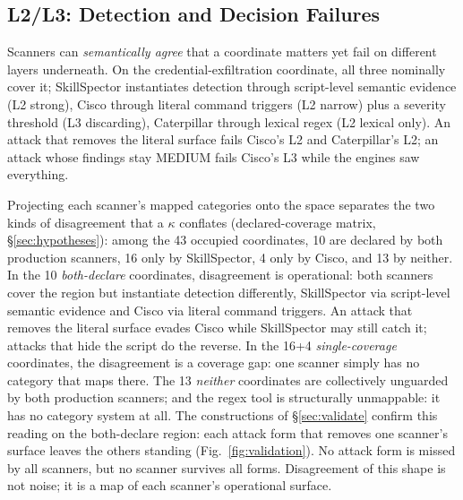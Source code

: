 \documentclass[sigconf,nonacm]{acmart}
\begin{document}
\subsection{L2/L3: Detection and Decision Failures}
Scanners can \emph{semantically agree} that a coordinate matters yet fail on different layers underneath. On the credential-exfiltration coordinate, all three nominally cover it; SkillSpector instantiates detection through script-level semantic evidence (L2 strong), Cisco through literal command triggers (L2 narrow) plus a severity threshold (L3 discarding), Caterpillar through lexical regex (L2 lexical only). An attack that removes the literal surface fails Cisco's L2 and Caterpillar's L2; an attack whose findings stay MEDIUM fails Cisco's L3 while the engines saw everything.

Projecting each scanner's mapped categories onto the space separates the two kinds of disagreement that a $\kappa$ conflates (declared-coverage matrix, \S\ref{sec:hypotheses}): among the 43 occupied coordinates, 10 are declared by both production scanners, 16 only by SkillSpector, 4 only by Cisco, and 13 by neither.  In the 10 \emph{both-declare} coordinates, disagreement is operational: both scanners cover the region but instantiate detection differently, SkillSpector via script-level semantic evidence and Cisco via literal command triggers. An attack that removes the literal surface evades Cisco while SkillSpector may still catch it; attacks that hide the script do the reverse. In the 16+4 \emph{single-coverage} coordinates, the disagreement is a coverage gap: one scanner simply has no category that maps there. The 13 \emph{neither} coordinates are collectively unguarded by both production scanners; and the regex tool is structurally unmappable: it has no category system at all. The constructions of \S\ref{sec:validate} confirm this reading on the both-declare region: each attack form that removes one scanner's surface leaves the others standing (Fig.~\ref{fig:validation}). No attack form is missed by all scanners, but no scanner survives all forms. Disagreement of this shape is not noise; it is a map of each scanner's operational surface.
\end{document}
